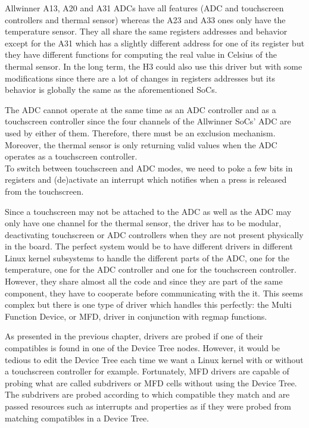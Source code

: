 Allwinner A13, A20 and A31 ADCs have all features (ADC and touchscreen controllers and thermal sensor) whereas the A23 and A33 ones only have the temperature sensor. They all share the same registers addresses and behavior except for the A31 which has a slightly different address for one of its register but they have different functions for computing the real value in Celsius of the thermal sensor. In the long term, the H3 could also use this driver but with some modifications since there are a lot of changes in registers addresses but its behavior is globally the same as the aforementioned SoCs.

The ADC cannot operate at the same time as an ADC controller and as a touchscreen controller since the four channels of the Allwinner SoCs' ADC are used by either of them. Therefore, there must be an exclusion mechanism. Moreover, the thermal sensor is only returning valid values when the ADC operates as a touchscreen controller.\\
To switch between touchscreen and ADC modes, we need to poke a few bits in registers and (de)activate an interrupt which notifies when a press is released from the touchscreen.

Since a touchscreen may not be attached to the ADC as well as the ADC may only have one channel for the thermal sensor, the driver has to be modular, deactivating touchscreen or ADC controllers when they are not present physically in the board. The perfect system would be to have different drivers in different Linux kernel subsystems to handle the different parts of the ADC, one for the temperature, one for the ADC controller and one for the touchscreen controller. However, they share almost all the code and since they are part of the same component, they have to cooperate before communicating with the it. This seems complex but there is one type of driver which handles this perfectly: the Multi Function Device, or MFD, driver in conjunction with regmap functions.

As presented in the previous chapter, drivers are probed if one of their compatibles is found in one of the Device Tree nodes. However, it would be tedious to edit the Device Tree each time we want a Linux kernel with or without a touchscreen controller for example. Fortunately, MFD drivers are capable of probing what are called subdrivers or MFD cells without using the Device Tree. The subdrivers are probed according to which compatible they match and are passed resources such as interrupts and properties as if they were probed from matching compatibles in a Device Tree.

